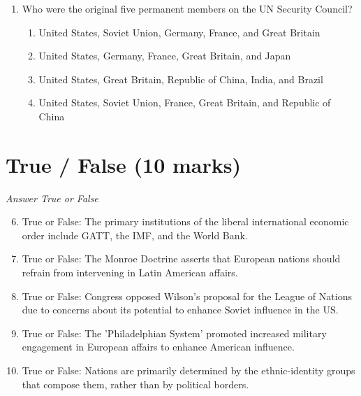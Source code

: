 \documentclass[12pt]{article}
\begin{document}
\begin{enumerate}[label=\arabic*.]
\begin{enumerate}[label=(\alph*)]
    \item Creation of the Department of Homeland Security
    \item Moving the Department of Defense Intelligence Agencies to the CIA for better coordination
    \item Creation of the National Intelligence Director
    \item Moving the domestic intelligence component of the FBI to the CIA
\end{enumerate}
\item Who were the original five permanent members on the UN Security Council?
\begin{enumerate}[label=(\alph*)]
    \item United States, Soviet Union, Germany, France, and Great Britain
    \item United States, Germany, France, Great Britain, and Japan
    \item United States, Great Britain, Republic of China, India, and Brazil
    \item United States, Soviet Union, France, Great Britain, and Republic of China
\end{enumerate}
\end{enumerate}

\section*{True / False (10 marks)}
\textit{Answer True or False}
\begin{enumerate}[label=\arabic*.]
\setcounter{enumi}{5}
\item True or False: The primary institutions of the liberal international economic order include GATT, the IMF, and the World Bank.
\item True or False: The Monroe Doctrine asserts that European nations should refrain from intervening in Latin American affairs.
\item True or False: Congress opposed Wilson's proposal for the League of Nations due to concerns about its potential to enhance Soviet influence in the US.
\item True or False: The 'Philadelphian System' promoted increased military engagement in European affairs to enhance American influence.
\item True or False: Nations are primarily determined by the ethnic-identity groups that compose them, rather than by political borders.
\end{enumerate}
\end{document}
